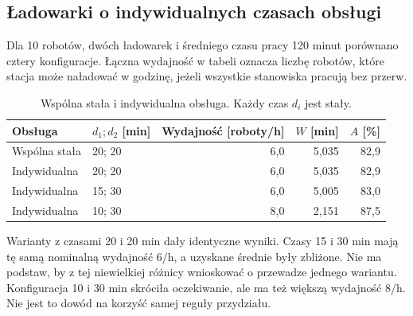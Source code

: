 \documentclass[11pt,a4paper]{article}
\begin{document}
\subsection{Ładowarki o indywidualnych czasach obsługi}
Dla 10 robotów, dwóch ładowarek i średniego czasu pracy 120 minut porównano cztery konfiguracje. Łączna wydajność w tabeli oznacza liczbę robotów, które stacja może naładować w godzinę, jeżeli wszystkie stanowiska pracują bez przerw.
\begin{table}[H]
\centering\small
\begin{tabular}{llrrr}
\toprule
Obsługa & $d_1;d_2$ [min] & Wydajność [roboty/h] & $W$ [min] & $A$ [\%] \\
\midrule
Wspólna stała & 20; 20 & 6,0 & 5,035 & 82,9 \\
Indywidualna & 20; 20 & 6,0 & 5,035 & 82,9 \\
Indywidualna & 15; 30 & 6,0 & 5,005 & 83,0 \\
Indywidualna & 10; 30 & 8,0 & 2,151 & 87,5 \\
\bottomrule
\end{tabular}
\caption{Wspólna stała i indywidualna obsługa. Każdy czas $d_i$ jest stały.}\label{tab:individual}
\end{table}
Warianty z czasami 20 i 20 min dały identyczne wyniki. Czasy 15 i 30 min mają tę samą nominalną wydajność 6/h, a uzyskane średnie były zbliżone. Nie ma podstaw, by z tej niewielkiej różnicy wnioskować o przewadze jednego wariantu. Konfiguracja 10 i 30 min skróciła oczekiwanie, ale ma też większą wydajność 8/h. Nie jest to dowód na korzyść samej reguły przydziału.
\end{document}
